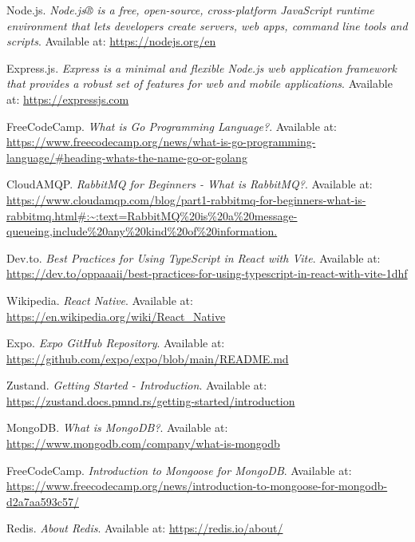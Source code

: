 \begin{thebibliography}{99}

    Node.js. \textit{Node.js® is a free, open-source, cross-platform JavaScript runtime environment that lets developers create servers, web apps, command line tools and scripts}. Available at: \url{https://nodejs.org/en}
        
    Express.js. \textit{Express is a minimal and flexible Node.js web application framework that provides a robust set of features for web and mobile applications}. Available at: \url{https://expressjs.com}
        
    FreeCodeCamp. \textit{What is Go Programming Language?}. Available at: \url{https://www.freecodecamp.org/news/what-is-go-programming-language/#heading-whats-the-name-go-or-golang}
        
    CloudAMQP. \textit{RabbitMQ for Beginners - What is RabbitMQ?}. Available at: \url{https://www.cloudamqp.com/blog/part1-rabbitmq-for-beginners-what-is-rabbitmq.html#:~:text=RabbitMQ%20is%20a%20message-queueing,include%20any%20kind%20of%20information.}
        
    Dev.to. \textit{Best Practices for Using TypeScript in React with Vite}. Available at: \url{https://dev.to/oppaaaii/best-practices-for-using-typescript-in-react-with-vite-1dhf}
        
    Wikipedia. \textit{React Native}. Available at: \url{https://en.wikipedia.org/wiki/React_Native}
        
    Expo. \textit{Expo GitHub Repository}. Available at: \url{https://github.com/expo/expo/blob/main/README.md}
        
    Zustand. \textit{Getting Started - Introduction}. Available at: \url{https://zustand.docs.pmnd.rs/getting-started/introduction}
        
    MongoDB. \textit{What is MongoDB?}. Available at: \url{https://www.mongodb.com/company/what-is-mongodb}
        
    FreeCodeCamp. \textit{Introduction to Mongoose for MongoDB}. Available at: \url{https://www.freecodecamp.org/news/introduction-to-mongoose-for-mongodb-d2a7aa593c57/}
        
    Redis. \textit{About Redis}. Available at: \url{https://redis.io/about/}


\end{thebibliography}
